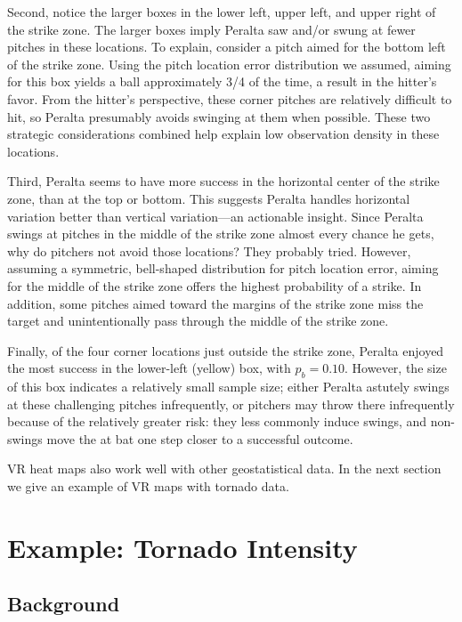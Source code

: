 Second, notice the larger boxes in the lower left, upper left, and upper right of the strike zone. The larger boxes imply Peralta saw and/or swung at fewer pitches in these locations. To explain, consider a pitch aimed for the bottom left of the strike zone. Using the pitch location error distribution we assumed, aiming for this box yields a ball approximately 3/4 of the time, a result in the hitter's favor. From the hitter's perspective, these corner pitches are relatively difficult to hit, so Peralta presumably avoids swinging at them when possible. These two strategic considerations combined help explain low observation density in these locations.

Third, Peralta seems to have more success in the horizontal center of the strike zone, than at the top or bottom. This suggests Peralta handles horizontal variation better than vertical variation---an actionable insight. Since Peralta swings at pitches in the middle of the strike zone almost every chance he gets, why do pitchers not avoid those locations? They probably tried. However, assuming a symmetric, bell-shaped distribution for pitch location error, aiming for the middle of the strike zone offers the highest probability of a strike. In addition, some pitches aimed toward the margins of the strike zone miss the target and unintentionally pass through the middle of the strike zone. 

Finally, of the four corner locations just outside the strike zone, Peralta enjoyed the most success in the lower-left (yellow) box, with $p_{b} = 0.10$. However, the size of this box indicates a relatively small sample size; either Peralta astutely swings at these challenging pitches infrequently, or pitchers may throw there infrequently because of the relatively greater risk: they less commonly induce swings, and non-swings move the at bat one step closer to a successful outcome. 

VR heat maps also work well with other geostatistical data. In the next section we give an example of VR maps with tornado data.

\section{Example: Tornado Intensity} \label{ETI}

\subsection{Background}

